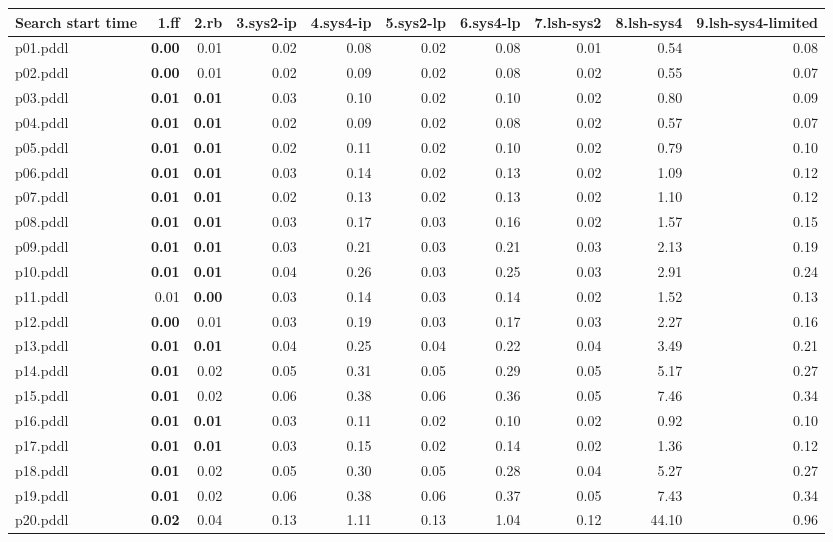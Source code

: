 \documentclass{article}
\begin{document}
\begin{tabular}{@{}lrrrrrrrrr@{}}
Search start time & 1.ff & 2.rb & 3.sys2-ip & 4.sys4-ip & 5.sys2-lp & 6.sys4-lp & 7.lsh-sys2 & 8.lsh-sys4 & 9.lsh-sys4-limited \\
\midrule
p01.pddl & \textbf{0.00} & 0.01 & 0.02 & 0.08 & 0.02 & 0.08 & 0.01 & 0.54 & 0.08 \\
p02.pddl & \textbf{0.00} & 0.01 & 0.02 & 0.09 & 0.02 & 0.08 & 0.02 & 0.55 & 0.07 \\
p03.pddl & \textbf{0.01} & \textbf{0.01} & 0.03 & 0.10 & 0.02 & 0.10 & 0.02 & 0.80 & 0.09 \\
p04.pddl & \textbf{0.01} & \textbf{0.01} & 0.02 & 0.09 & 0.02 & 0.08 & 0.02 & 0.57 & 0.07 \\
p05.pddl & \textbf{0.01} & \textbf{0.01} & 0.02 & 0.11 & 0.02 & 0.10 & 0.02 & 0.79 & 0.10 \\
p06.pddl & \textbf{0.01} & \textbf{0.01} & 0.03 & 0.14 & 0.02 & 0.13 & 0.02 & 1.09 & 0.12 \\
p07.pddl & \textbf{0.01} & \textbf{0.01} & 0.02 & 0.13 & 0.02 & 0.13 & 0.02 & 1.10 & 0.12 \\
p08.pddl & \textbf{0.01} & \textbf{0.01} & 0.03 & 0.17 & 0.03 & 0.16 & 0.02 & 1.57 & 0.15 \\
p09.pddl & \textbf{0.01} & \textbf{0.01} & 0.03 & 0.21 & 0.03 & 0.21 & 0.03 & 2.13 & 0.19 \\
p10.pddl & \textbf{0.01} & \textbf{0.01} & 0.04 & 0.26 & 0.03 & 0.25 & 0.03 & 2.91 & 0.24 \\
p11.pddl & 0.01 & \textbf{0.00} & 0.03 & 0.14 & 0.03 & 0.14 & 0.02 & 1.52 & 0.13 \\
p12.pddl & \textbf{0.00} & 0.01 & 0.03 & 0.19 & 0.03 & 0.17 & 0.03 & 2.27 & 0.16 \\
p13.pddl & \textbf{0.01} & \textbf{0.01} & 0.04 & 0.25 & 0.04 & 0.22 & 0.04 & 3.49 & 0.21 \\
p14.pddl & \textbf{0.01} & 0.02 & 0.05 & 0.31 & 0.05 & 0.29 & 0.05 & 5.17 & 0.27 \\
p15.pddl & \textbf{0.01} & 0.02 & 0.06 & 0.38 & 0.06 & 0.36 & 0.05 & 7.46 & 0.34 \\
p16.pddl & \textbf{0.01} & \textbf{0.01} & 0.03 & 0.11 & 0.02 & 0.10 & 0.02 & 0.92 & 0.10 \\
p17.pddl & \textbf{0.01} & \textbf{0.01} & 0.03 & 0.15 & 0.02 & 0.14 & 0.02 & 1.36 & 0.12 \\
p18.pddl & \textbf{0.01} & 0.02 & 0.05 & 0.30 & 0.05 & 0.28 & 0.04 & 5.27 & 0.27 \\
p19.pddl & \textbf{0.01} & 0.02 & 0.06 & 0.38 & 0.06 & 0.37 & 0.05 & 7.43 & 0.34 \\
p20.pddl & \textbf{0.02} & 0.04 & 0.13 & 1.11 & 0.13 & 1.04 & 0.12 & 44.10 & 0.96 \\
\end{tabular}
\end{document}
